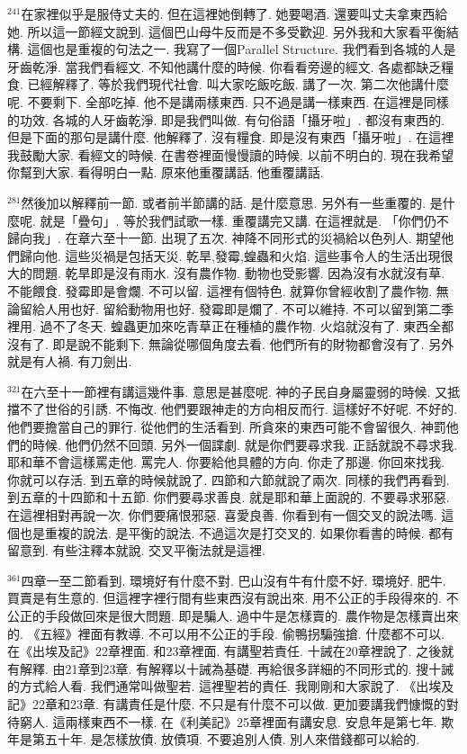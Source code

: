 \documentclass{book}
\begin{document}
$^{241}$在家裡似乎是服侍丈夫的.
但在這裡她倒轉了.
她要喝酒.
還要叫丈夫拿東西給她.
所以這一節經文說到.
這個巴山母牛反而是不多受歡迎.
另外我和大家看平衡結構.
這個也是重複的句法之一.
我寫了一個Parallel Structure.
我們看到各城的人是牙齒乾淨.
當我們看經文.
不知他講什麼的時候.
你看看旁邊的經文.
各處都缺乏糧食.
已經解釋了.
等於我們現代社會.
叫大家吃飯吃飯.
講了一次.
第二次他講什麼呢.
不要剩下.
全部吃掉.
他不是講兩樣東西.
只不過是講一樣東西.
在這裡是同樣的功效.
各城的人牙齒乾淨.
即是我們叫做.
有句俗語「攝牙啦」.
都沒有東西的.
但是下面的那句是講什麼.
他解釋了.
沒有糧食.
即是沒有東西「攝牙啦」.
在這裡我鼓勵大家.
看經文的時候.
在書卷裡面慢慢讀的時候.
以前不明白的.
現在我希望你幫到大家.
看得明白一點.
原來他重覆講話.
他重覆講話.

$^{281}$然後加以解釋前一節.
或者前半節講的話.
是什麼意思.
另外有一些重覆的.
是什麼呢.
就是「疊句」.
等於我們試歌一樣.
重覆講完又講.
在這裡就是.
「你們仍不歸向我」.
在章六至十一節.
出現了五次.
神降不同形式的災禍給以色列人.
期望他們歸向他.
這些災禍是包括天災.
乾旱,發霉,蝗蟲和火焰.
這些事令人的生活出現很大的問題.
乾旱即是沒有雨水.
沒有農作物.
動物也受影響.
因為沒有水就沒有草.
不能餵食.
發霉即是會爛.
不可以留.
這裡有個特色.
就算你曾經收割了農作物.
無論留給人用也好.
留給動物用也好.
發霉即是爛了.
不可以維持.
不可以留到第二季裡用.
過不了冬天.
蝗蟲更加來吃青草正在種植的農作物.
火焰就沒有了.
東西全都沒有了.
即是說不能剩下.
無論從哪個角度去看.
他們所有的財物都會沒有了.
另外就是有人禍.
有刀劍出.

$^{321}$在六至十一節裡有講這幾件事.
意思是甚麼呢.
神的子民自身屬靈弱的時候.
又抵擋不了世俗的引誘.
不悔改.
他們要跟神走的方向相反而行.
這樣好不好呢.
不好的.
他們要擔當自己的罪行.
從他們的生活看到.
所貪來的東西可能不會留很久.
神罰他們的時候.
他們仍然不回頭.
另外一個諜劇.
就是你們要尋求我.
正話就說不尋求我.
耶和華不會這樣罵走他.
罵完人.
你要給他具體的方向.
你走了那邊.
你回來找我.
你就可以存活.
到五章的時候就說了.
四節和六節就說了兩次.
同樣的我們再看到.
到五章的十四節和十五節.
你們要尋求善良.
就是耶和華上面說的.
不要尋求邪惡.
在這裡相對再說一次.
你們要痛恨邪惡.
喜愛良善.
你看到有一個交叉的說法嗎.
這個也是重複的說法.
是平衡的說法.
不過這次是打交叉的.
如果你看書的時候.
都有留意到.
有些注釋本就說.
交叉平衡法就是這裡.

$^{361}$四章一至二節看到.
環境好有什麼不對.
巴山沒有牛有什麼不好.
環境好.
肥牛.
買賣是有生意的.
但這裡字裡行間有些東西沒有說出來.
用不公正的手段得來的.
不公正的手段做回來是很大問題.
即是騙人.
過中牛是怎樣賣的.
農作物是怎樣賣出來的.
《五經》裡面有教導.
不可以用不公正的手段.
偷鴨拐騙強搶.
什麼都不可以.
在《出埃及記》22章裡面.
和23章裡面.
有講聖若責任.
十誡在20章裡說了.
之後就有解釋.
由21章到23章.
有解釋以十誡為基礎.
再給很多詳細的不同形式的.
搜十誡的方式給人看.
我們通常叫做聖若.
這裡聖若的責任.
我剛剛和大家說了.
《出埃及記》22章和23章.
有講責任是什麼.
不只是有什麼不可以做.
更加要講我們慷慨的對待窮人.
這兩樣東西不一樣.
在《利美記》25章裡面有講安息.
安息年是第七年.
欺年是第五十年.
是怎樣放債.
放債項.
不要追別人債.
別人來借錢都可以給的.
\end{document}

